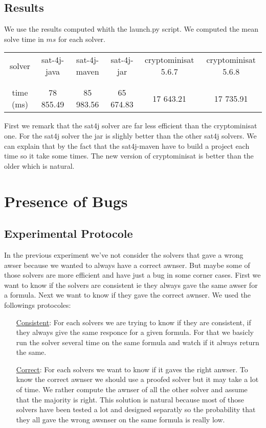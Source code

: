\documentclass{article}
\begin{document}
\subsection{Results}
We use the results computed whith the launch.py script. We computed the mean solve time in $ms$ for each solver.

\vskip 3mm

\begin{tabular}{|c|c|c|c|c|c|}
\hline
  solver & sat-4j-java & sat-4j-maven & sat-4j-jar & cryptominisat 5.6.7 & cryptominisat 5.6.8 \\
 & & & & & \\   \hline  & & & & & \\ 
  time (ms) & 78 855.49 & 85 983.56 & 65 674.83 &  17 643.21 & 17 735.91 \\
  \hline
\end{tabular}

\vskip 3mm

First we remark that the sat4j solver are far less efficient than the cryptominisat one. For the sat4j solver the jar is slighly better than the other sat4j solvers. We can explain that by the fact that the sat4j-maven have to build a project each time so it take some times. The new version of cryptominisat is better than the older which is natural. 

\section{Presence of Bugs}
\subsection{Experimental Protocole}
In the previous experiment we've not consider the solvers that gave a wrong awser because we wanted to always have a correct awnser. But maybe some of those solvers are more efficient and have just a bug in some corner cases. First we want to know if the solvers are consistent ie they always gave the same awser for a formula. Next we want to know if they gave the correct awnser.  
We used the followings protocoles:

\vskip 3mm

\begin{itemize}
\item[\underline{Consistent}:]  For each solvers we are trying to know if they are consistent, if they always give the same responce for a given formula. For that we basicly run the solver several time on the same formula and watch if it always return the same. 
\item[\underline{Correct}:] For each solvers we want to know if it gaves the right anwser. To know the correct awnser we should use a proofed solver but it may take a lot of time. We rather compute the awnser of all the other solver and assume that the majority is right. This solution is natural because most of those solvers have been tested a lot and designed separatly so the probability that they all gave the wrong awsnser on the same formula is really low. 
\end{itemize}
\end{document}
